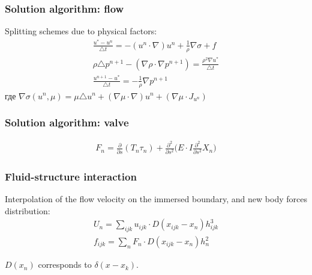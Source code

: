 \documentclass[14pt]{beamer}
\begin{document}
\begin{frame}
\frametitle{Solution algorithm: flow}
Splitting schemes due to physical factors:
\begin{gather}
    \label{eq:split_first}
    \frac{u^* - u^n}{\triangle t} = - (u^n \cdot \nabla) u^n + \frac{1}{\rho} \nabla \sigma + f\\
    \label{eq:split_second}
    \rho \triangle p^{n+1} - (\nabla \rho \cdot \nabla p^{n+1}) = \frac{\rho^2 \nabla u^*}{\triangle t}\\
    \label{eq:split_third}
    \frac{u^{n+1} - u^*}{\triangle t} = - \frac{1}{\rho} \nabla p^{n+1}
\end{gather}
где $\nabla \sigma (u^n, \mu) = \mu \triangle u^n + (\nabla \mu \cdot \nabla) u^n + (\nabla \mu \cdot J_{u^n}) $
\end{frame}

\begin{frame}
\frametitle{Solution algorithm: valve}
\begin{gather}
    \label{eq:strain_energy}
    F_{n} =  \frac{\partial}{\partial s}(T_{n} \tau_{n}) + \frac{\partial^2}{\partial s^2} \Big( E \cdot I \frac{\partial^2}{\partial s^2} X_{n} \Big)
\end{gather}
\end{frame}

\begin{frame}
\frametitle{Fluid-structure interaction}
Interpolation of the flow velocity on the immersed boundary, and new body
forces distribution:
\begin{gather}
    \label{eq:interpolation}
    U_n = \sum_{ijk}u_{ijk} \cdot D(x_{ijk} - x_n) h_{ijk}^3 \\
    \label{eq:spreading}
    f_{ijk} = \sum_n F_n \cdot D(x_{ijk} - x_n) h^2_n
\end{gather}

$D(x_n)$ corresponds to $\delta(x - x_k)$.
\end{frame}
\end{document}
